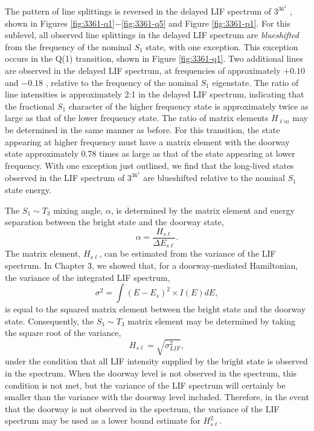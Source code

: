 \documentclass[12pt]{mitthesis}
\begin{document}
The pattern of line splittings is reversed in the delayed LIF spectrum
of $3^36^1$ , shown in Figures
\ref{fig:3361-q1}$-$\ref{fig:3361-q5} and Figure \ref{fig:3361-p1}.
For this sublevel, all observed line splittings in the delayed LIF
spectrum are \emph{blueshifted} from the frequency of the nominal
$S_1$ state, with one exception.  This exception occurs in the Q(1)
transition, shown in Figure \ref{fig:3361-q1}.  Two additional lines
are observed in the delayed LIF spectrum, at frequencies of
approximately $+0.10$ and $-0.18$ \rcm, relative to the frequency of
the nominal $S_1$ eigenstate.  The ratio of line intensities is
approximately 2:1 in the delayed LIF spectrum, indicating that the
fractional $S_1$ character of the higher frequency state is
approximately twice as large as that of the lower frequency state.
The ratio of matrix elements $H_{\ell m}$ may be determined in the
same manner as before.  For this transition, the state appearing at
higher frequency must have a matrix element with the doorway state
approximately 0.78 times as large as that of the state appearing at
lower frequency.  With one exception just outlined, we find that the
long-lived states observed in the LIF spectrum of $3^36^1$  are
blueshifted relative to the nominal $S_1$ state energy.

The $S_1 \sim T_3$ mixing angle, $\alpha$, is determined by the
matrix element and energy separation between the bright state and the
doorway state,
\begin{equation}
  \alpha = \frac{H_{s \ell}}{\Delta E_{s\ell}}.
\end{equation}
The matrix element, $H_{s \ell}$, can be estimated from the variance
of the LIF spectrum.  In Chapter 3, we showed that, for a
doorway-mediated Hamiltonian, the variance of the integrated LIF
spectrum,
\begin{equation}
  \label{eq:doorway-var}
  \sigma^2 = \int (E - E_s)^2 \times I(E) dE,
\end{equation}
is equal to the squared matrix element between the bright state and
the doorway state.  Consequently, the $S_1 \sim T_3$ matrix element
may be determined by taking the square root of the variance,
\begin{equation}
  H_{s \ell} = \sqrt{\sigma^2_{LIF}},
\end{equation}
under the condition that all LIF intensity supplied by the bright
state is observed in the spectrum.  When the doorway level is not
observed in the spectrum, this condition is not met, but the variance
of the LIF spectrum will certainly be smaller than the variance with
the doorway level included.  Therefore, in the event that the doorway
is not observed in the spectrum, the variance of the LIF spectrum may
be used as a lower bound estimate for $H_{s \ell}^2$.  
\end{document}
